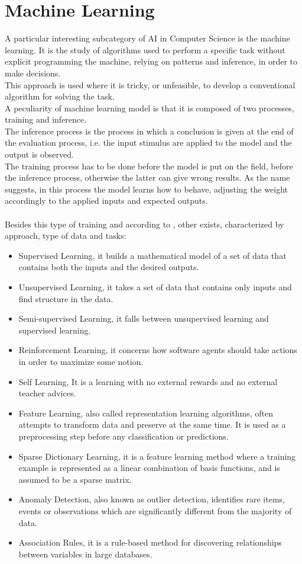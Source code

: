 \section{Machine Learning}
A particular interesting subcategory of AI in Computer Science is the machine learning. It is the study of algorithms used to perform a specific task without explicit programming the machine, relying on patterns and inference, in order to make decisions.\\ This approach is used where it is tricky, or unfeasible, to develop a conventional algorithm for solving the task.\\

A peculiarity of machine learning model is that it is composed of two processes, training and inference.\\
The inference process is the process in which a conclusion is given at the end of the evaluation process, i.e. the input stimulus are applied to the model and the output is observed.\\
The training process has to be done before the model is put on the field, before the inference process, otherwise the latter can give wrong results. As the name suggests, in this process the model learns how to behave, adjusting the weight accordingly to the applied inputs and expected outputs. \\\\Besides this type of training and according to \cite{book:1}, other exists, characterized by approach, type of data and tasks:
\begin{itemize}
\item Supervised Learning, it builds a mathematical model of a set of data that contains both the inputs and the desired outputs.
\item Unsupervised Learning, it takes a set of data that contains only inputs and find structure in the data.
\item Semi-supervised Learning, it falls between unsupervised learning and supervised learning.
\item Reinforcement Learning, it concerns how software agents should take actions in order to maximize some notion.
\item Self Learning, It is a learning with no external rewards and no external teacher advices.
\item Feature Learning, also called representation learning algorithms, often attempts to transform data and preserve at the same time. It is used as a preprocessing step before any classification or predictions.
\item Sparse Dictionary Learning, it is a feature learning method where a training example is represented as a linear combination of basis functions, and is assumed to be a sparse matrix.
\item Anomaly Detection, also known as outlier detection,
identifies rare items, events or observations which are significantly different from the majority of data.
\item Association Rules, it is a rule-based method for discovering relationships between variables in large databases.
\end{itemize}

